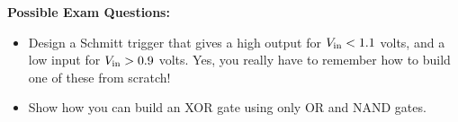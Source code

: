 \begin{enumerate}[wide]

\end{enumerate}


\vfill
\textbf{Possible Exam Questions:}

\begin{itemize}

\item Design a Schmitt trigger that gives a high output for $V_{\rm in}<1.1$ volts, and a low input for $V_{\rm in}>0.9$ volts.  Yes, you really have to remember how to build one of these from scratch!

\item Show how you can build an XOR gate using only OR and NAND gates.
\end{itemize}






